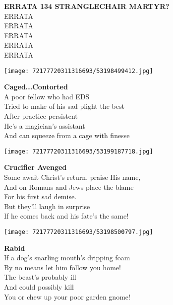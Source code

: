 \documentclass[10pt,letterpaper]{article}
\begin{document}
\begin{center}
\textbf{ERRATA 134 STRANGLECHAIR MARTYR?}\\
\vskip 0.2in
ERRATA\\
ERRATA\\
ERRATA\\
ERRATA\\
ERRATA\\
\end{center}
\pagebreak

\begin{center}\texttt{[image: 72177720311316693/53198499412.jpg]}
\end{center}
\begin{center}
\textbf{Caged...Contorted}\\
\vskip 0.2in
A poor fellow who had EDS\\
Tried to make of his sad plight the best\\
After practice persistent\\
He's a magician's assistant\\
And can squeeze from a cage with finesse\\
\end{center}
\pagebreak

\begin{center}
\texttt{[image: 72177720311316693/53199187718.jpg]}
\end{center}

\begin{center}
\textbf{Crucifier Avenged}\\
\vskip 0.2in
Some await Christ's return, praise His name,\\
And on Romans and Jews place the blame\\
For his first sad demise.\\
But they'll laugh in surprise\\
If he comes back and his fate's the same!\\
\end{center}
\pagebreak

\begin{center}\texttt{[image: 72177720311316693/53198500797.jpg]}
\end{center}
\begin{center}
\textbf{Rabid}\\
\vskip 0.2in
If a dog's snarling mouth's dripping foam\\
By no means let him follow you home!\\
The beast's probably ill\\
And could possibly kill\\
You or chew up your poor garden gnome!\\
\end{center}
\pagebreak
\end{document}
